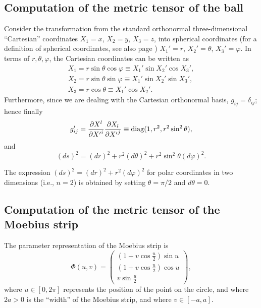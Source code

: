{
\color{blue}
\bexample
\subsection*{Computation of the metric tensor of the ball}
Consider the transformation from the standard orthonormal
three-dimensional ``Cartesian'' coordinates
$X_1=x$,
$X_2=y$,
$X_3=z$,
into spherical coordinates
(for a definition of spherical coordinates, see also page \pageref{2011-m-spericalcoo})
$X_1'=r$,
$X_2'=\theta$,
$X_3'=\varphi$.
In terms of  $r,\theta , \varphi$, the Cartesian coordinates can be written as
\begin{equation}
\begin{split}
 X_1=r \sin \theta \cos \varphi \equiv X_1' \sin X_2' \cos X_3'  , \\
 X_2=r \sin \theta \sin \varphi \equiv X_1'\sin X_2' \sin X_3'  ,    \\
 X_3=r \cos \theta  \equiv X_1'\cos X_2'  .
\end{split}
\end{equation}
Furthermore,  since we are dealing with the Cartesian orthonormal basis,
$g_{ij}=\delta_{ij}$; hence finally
\begin{equation}
g'_{ij}= {\partial {X}^l\over \partial {X'}^i}{\partial {X}_l\over \partial {X'}^j}
\equiv {\rm diag}(1,r^2,r^2\sin^2 \theta ),
\end{equation}
and
\begin{equation}
(ds)^2 =(dr)^2+r^2(d\theta )^2+r^2\sin^2 \theta (d\varphi )^2.
\end{equation}

The expression $(ds)^2 =(dr)^2+r^2(d\varphi )^2$
for polar coordinates in two dimensions (i.e., $n=2$) is obtained by setting $\theta = \pi/2 $ and $d\theta =0$.

\subsection*{Computation of the metric tensor of the Moebius strip}
The parameter representation of the Moebius strip is
\begin{equation}
\Phi (u,v) =\left(
\begin{array}{c}
(1+v\cos \frac{u}{2})\sin u \\
(1+v\cos \frac{u}{2})\cos u \\
v\sin \frac{u}{2}
\end{array}
\right),
\end{equation}
where
$u\in [0,2\pi ]$ represents the position of the point on the circle,  and where $2a>0$ is the ``width'' of the Moebius strip,
and where $v\in [-a,a]$.


}
